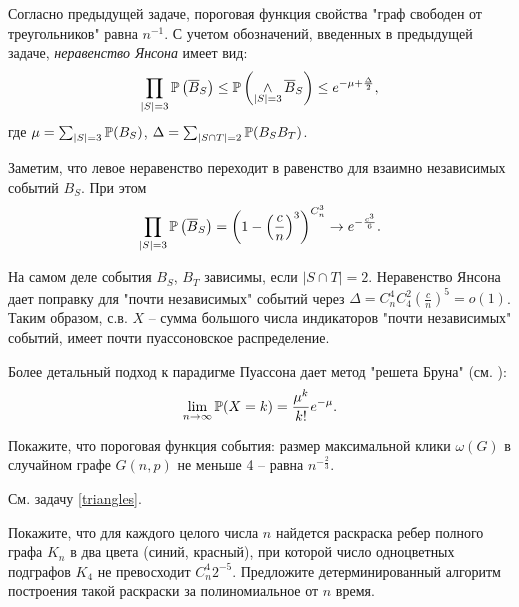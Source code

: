 \begin{remark}
Согласно предыдущей задаче, пороговая функция свойства "граф свободен от треугольников"  равна $n^{-1}$. С учетом обозначений, введенных в предыдущей задаче, \textit{неравенство Янсона} имеет вид:
\[
\prod _{|S|=3} \mathrm{{\mathbb P}} \left( \overline{B}_{S} \right)  \le \mathrm{{\mathbb P}} \left(\mathop{\wedge }\limits_{|S|=3} \overline{B}_{S} \right) \leq e^{-\mu +\frac{\Delta }{2} },
\] 
где $\mu =\sum _{|S|=3} \mathrm{{\mathbb P}}( B_{S} )  $, $\Delta =\sum _{|S\cap T|=2} \mathrm{{\mathbb P}}( B_{S} B_{T} )$.

Заметим, что левое неравенство переходит в равенство для взаимно независимых событий $B_S$. При этом 
$$\prod _{|S|=3} \mathrm{{\mathbb P}} \left( \overline{B}_{S} \right) = \left (1 - \left( \frac{c}{n} \right)^3  \right )^{C_n^3}\to e^{-\frac{c^3}{6}}.$$

На самом деле события $B_S$, $B_T$ зависимы, если $|S\cap T|=2$. Неравенство Янсона дает поправку для "почти независимых" событий через $\Delta=C_n^4C_4^2 \left( \frac {c}{n}\right)^5 = o(1)$. Таким образом, с.в. $X$ -- сумма большого числа индикаторов "почти независимых" событий, имеет почти пуассоновское распределение. 

Более детальный подход к парадигме Пуассона дает метод "решета Бруна" (см. \cite{15}):
$$
\lim_{n\to\infty}\mathrm{{\mathbb P}} (X=k) = \frac{\mu^k}{k!}e^{ -\mu}.
$$
\end{remark}

\begin{problem} 
Покажите, что пороговая функция события: размер максимальной клики $\omega (G)$ в случайном графе $G(n,p)$ не меньше 4 -- равна $n^{-\frac{2}{3} } $.
\end{problem}

\begin{ordre}
См. задачу \ref{triangles}. 
\end{ordre}



\begin{problem}
Покажите, что для каждого целого числа $n$ найдется раскраска ребер полного графа $K_{n} $ в два цвета (синий, красный), при которой число одноцветных подграфов $K_{4} $ не превосходит $C_{n}^{4} 2^{-5} $. Предложите детерминированный алгоритм построения такой раскраски за полиномиальное от $n$ время.
\end{problem}


